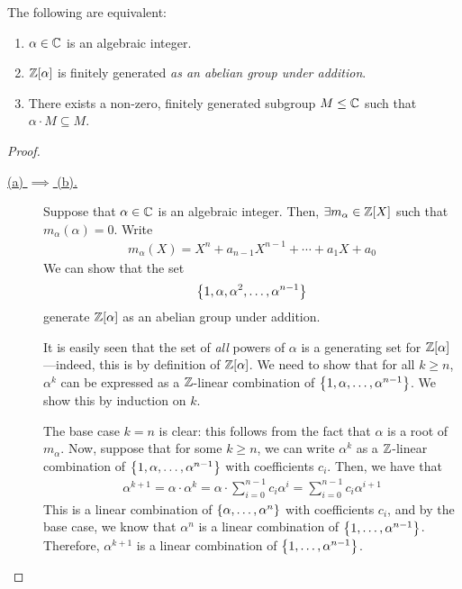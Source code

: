 \begin{boxproposition}\label{Ch2:Prop:CharacterisationofAlgInt}
    The following are equivalent:
    \begin{enumerate}[label = \normalfont (\alph*)]
        \item $\alpha \in \mathbb{C}$ is an algebraic integer.
        \item $\mathbb{Z}\!\left[ \alpha \right]$ is finitely generated \emph{as an abelian group under addition}.
        \item There exists a non-zero, finitely generated subgroup $M \leq \mathbb{C}$ such that $\alpha \cdot M \subseteq M$.
    \end{enumerate}
\end{boxproposition}
\begin{proof}\hfill
    \begin{description}
        \item[\underline{(a) $\implies$ (b).}] Suppose that $\alpha \in \mathbb{C}$ is an algebraic integer. Then, $\exists m_{\alpha} \in \mathbb{Z}[X]$ such that $m_{\alpha}(\alpha) = 0$. Write
        \begin{align*}
            m_{\alpha}(X) = X^n + a_{n-1}X^{n-1} + \cdots + a_1X + a_0
        \end{align*}
        We can show that the set
        \begin{align*}
            \left\{ 1, \alpha, \alpha^2, \ldots, \alpha^{n-1} \right\}
        \end{align*}
        generate $\mathbb{Z}\!\left[ \alpha \right]$ as an abelian group under addition.

        It is easily seen that the set of \textit{all} powers of $\alpha$ is a generating set for $\mathbb{Z}\!\left[ \alpha \right]$---indeed, this is by definition of $\mathbb{Z}\!\left[ \alpha \right]$. We need to show that for all $k \geq n$, $\alpha^{k}$ can be expressed as a $\mathbb{Z}$-linear combination of $\left\{ 1, \alpha, \ldots, \alpha^{n-1} \right\}$. We show this by induction on $k$.

        The base case $k = n$ is clear: this follows from the fact that $\alpha$ is a root of $m_{\alpha}$. Now, suppose that for some $k \geq n$, we can write $\alpha^{k}$ as a $\mathbb{Z}$-linear combination of $\left\{ 1, \alpha, \ldots, \alpha^{n-1} \right\}$ with coefficients $c_i$. Then, we have that
        \begin{align*}
            \alpha^{k+1} = \alpha \cdot \alpha^{k} = \alpha \cdot \sum_{i=0}^{n-1} c_i \alpha^{i} = \sum_{i=0}^{n-1} c_i \alpha^{i+1}
        \end{align*}
        This is a linear combination of $\left\{ \alpha, \ldots, \alpha^{n} \right\}$ with coefficients $c_i$, and by the base case, we know that $\alpha^n$ is a linear combination of $\left\{ 1, \ldots, \alpha^{n-1} \right\}$. Therefore, $\alpha^{k+1}$ is a linear combination of $\left\{ 1, \ldots, \alpha^{n-1} \right\}$.


\end{description}
\end{proof}
